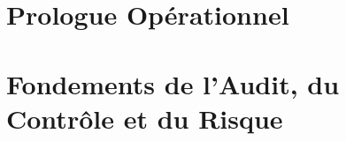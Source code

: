 \documentclass[12pt, twoside, openright, a4paper]{book}
\begin{document}
\frontmatter

    
    \cleardoublepage

    
    \cleardoublepage

    
    \cleardoublepage

    
    \cleardoublepage

    \tableofcontents
    \cleardoublepage

    \listoffigures
    \listoftables
    \cleardoublepage

\mainmatter

    \part*{Prologue Opérationnel}

        \setcounter{chapter}{-1}

    \part{Fondements de l'Audit, du Contrôle et du Risque}
    \label{part:fondements}
\end{document}
